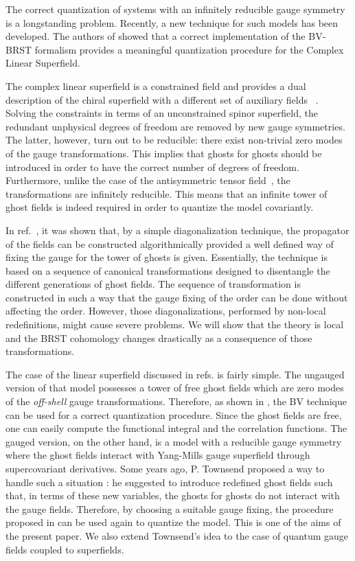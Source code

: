 \documentclass[a4paper,12pt]{article}
\begin{document}
The correct quantization of systems with an infinitely reducible gauge
symmetry is a longstanding problem. Recently, a new technique for such
models has been developed.  The authors of \cite{GPZ} showed that a
correct implementation of the BV-BRST \cite{BV,BRST}
formalism provides a meaningful quantization procedure for the Complex
Linear Superfield.

The complex linear superfield is a constrained field and provides a
dual description of the chiral superfield with a different set of
auxiliary fields ~\cite{gates,superspace,WZNW,YMSG,Deo}.  Solving the
constraints in terms of an unconstrained spinor superfield, the
redundant unphysical degrees of freedom are removed by new gauge
symmetries. The latter, however, turn out to be reducible: there exist
non-trivial zero modes of the gauge transformations.  This implies
that ghosts for ghosts should be introduced in order to have the
correct number of degrees of freedom. Furthermore, unlike the case of
the antisymmetric tensor field~\cite{AT}, the transformations are
infinitely reducible. This means that an infinite tower of ghost
fields is indeed required in order to quantize the model covariantly.

In ref.~\cite{GPZ}, it was shown that, by a simple diagonalization
technique, the propagator of the fields can be constructed
algorithmically provided a well defined way of fixing the gauge for
the tower of ghosts is given. Essentially, the technique is based on a
sequence of canonical transformations designed to disentangle the
different generations of ghost fields. The sequence of transformation
is constructed in such a way that the gauge fixing of the \coordHE{} order
can be done without affecting the \coordHE{} order.  However, those
diagonalizations, performed by non-local redefinitions, might cause
severe problems. We will show that the theory is local and the
BRST cohomology changes drastically as a consequence of those
transformations.

The case of the linear superfield discussed in refs. \cite{GPZ,PZ} is
fairly simple. The ungauged version of that model possesses a tower of
free ghost fields which are zero modes of the {\it off-shell} gauge
transformations.  Therefore, as shown in \cite{GPZ}, the BV technique
can be used for a correct quantization procedure. Since the ghost
fields are free, one can easily compute the functional integral and
the correlation functions. The gauged version, on the other hand, is a
model with a reducible gauge symmetry where the ghost fields interact
with Yang-Mills gauge superfield through supercovariant derivatives.
Some years ago, P.  Townsend proposed a way to handle such a situation
\cite{3lectures}: he suggested to introduce redefined ghost fields
such that, in terms of these new variables, the ghosts for ghosts do
not interact with the gauge fields. Therefore, by choosing a suitable
gauge fixing, the procedure proposed in \cite{GPZ} can be used again
to quantize the model. This is one of the aims of the present paper.
We also extend Townsend's idea to the case of quantum gauge fields
coupled to superfields.
\end{document}
